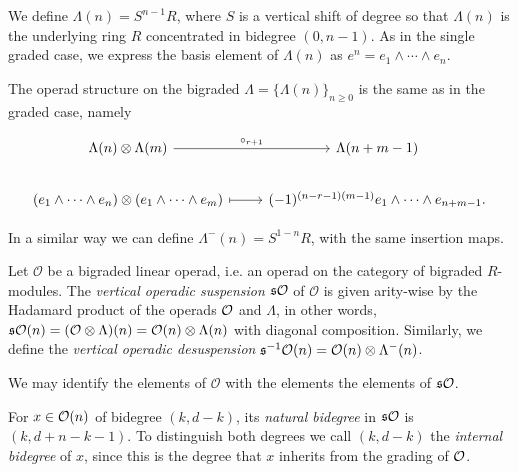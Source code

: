 \documentclass[join.tex]{subfiles}
\begin{document}
We define $\Lambda(n)=S^{n-1}R$, where  $S$ is a vertical shift of degree so that $\Lambda(n)$ is the underlying ring $R$ concentrated in bidegree  $(0,n-1)$. As in the single graded case, we express the basis element of $\Lambda(n)$ as $e^n=e_1\land\cdots\land e_n$.

The operad structure on the bigraded $\Lambda=\{\Lambda(n)\}_{n\geq 0}$ is the same as in the graded case, namely

\[
\begin{tikzcd}
\Lambda(n)\otimes\Lambda(m) \arrow[r, "\circ_{r+1}"] & \Lambda(n+m-1)\\
(e_1\land\cdots\land e_n)\otimes(e_1\land\cdots\land e_m)\arrow[r, mapsto] & (-1)^{(n-r-1)(m-1)}e_1\land\cdots\land e_{n+m-1}.
\end{tikzcd}
\]



In a similar way we can define $\Lambda^-(n)=S^{1-n}R$, with the same insertion maps.
\begin{defin}
Let $\mathcal{O}$ be a bigraded linear operad, i.e. an operad on the category of bigraded $R$-modules. The \emph{vertical operadic suspension} $\mathfrak{s}{\mathcal O}$ of $\mathcal{O}$ is given arity-wise by the Hadamard product of the operads ${\mathcal O}$ and $\Lambda$, in other words, $\mathfrak{s}{\mathcal O}(n)=(\mathcal{O}\otimes\Lambda)(n)=\mathcal{O}(n)\otimes\Lambda(n)$ with diagonal composition.%
Similarly, we define the \emph{vertical operadic desuspension} $\mathfrak{s}^{-1}{\mathcal O}(n)=\mathcal{O}(n)\otimes\Lambda^-(n)$. %
\end{defin}


We may identify the elements of $\mathcal{O}$ with the elements the elements of $\mathfrak{s}{\mathcal O}$. 
\begin{defin}
For $x\in{\mathcal O}(n)$ of bidegree $(k,d-k)$, its \emph{natural bidegree} in $\mathfrak{s}{\mathcal O}$ is $(k,d+n-k-1)$. To distinguish both degrees we call $(k,d-k)$ the \emph{internal bidegree} of $x$, since this is the degree that $x$ inherits from the grading of ${\mathcal O}$. 
\end{defin}
\end{document}
